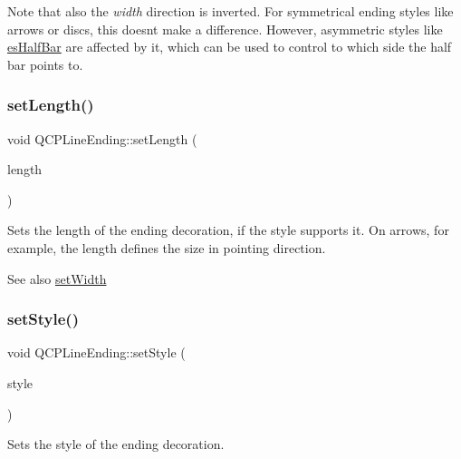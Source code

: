 Note that also the {\itshape width} direction is inverted. For symmetrical ending styles like arrows or discs, this doesn\textquotesingle{}t make a difference. However, asymmetric styles like \hyperlink{class_q_c_p_line_ending_a5ef16e6876b4b74959c7261d8d4c2cd5a126c390f0c359fcd8df1fc5e38d26d5b}{es\+Half\+Bar} are affected by it, which can be used to control to which side the half bar points to. \mbox{\label{class_q_c_p_line_ending_ae36fa01763751cd64b7f56c3507e935a}} 
\subsubsection{\texorpdfstring{set\+Length()}{setLength()}}
{\footnotesize\ttfamily void Q\+C\+P\+Line\+Ending\+::set\+Length (\begin{DoxyParamCaption}\item[{double}]{length }\end{DoxyParamCaption})}

Sets the length of the ending decoration, if the style supports it. On arrows, for example, the length defines the size in pointing direction.

\begin{DoxySeeAlso}{See also}
\hyperlink{class_q_c_p_line_ending_a26dc020ea985a72cc25881ce2115e34e}{set\+Width} 
\end{DoxySeeAlso}
\mbox{\label{class_q_c_p_line_ending_a56953b9cb8ed1bed0f025c3935f16910}} 
\subsubsection{\texorpdfstring{set\+Style()}{setStyle()}}
{\footnotesize\ttfamily void Q\+C\+P\+Line\+Ending\+::set\+Style (\begin{DoxyParamCaption}\item[{\hyperlink{class_q_c_p_line_ending_a5ef16e6876b4b74959c7261d8d4c2cd5}{Q\+C\+P\+Line\+Ending\+::\+Ending\+Style}}]{style }\end{DoxyParamCaption})}

Sets the style of the ending decoration. \mbox{\label{class_q_c_p_line_ending_a26dc020ea985a72cc25881ce2115e34e}} 
